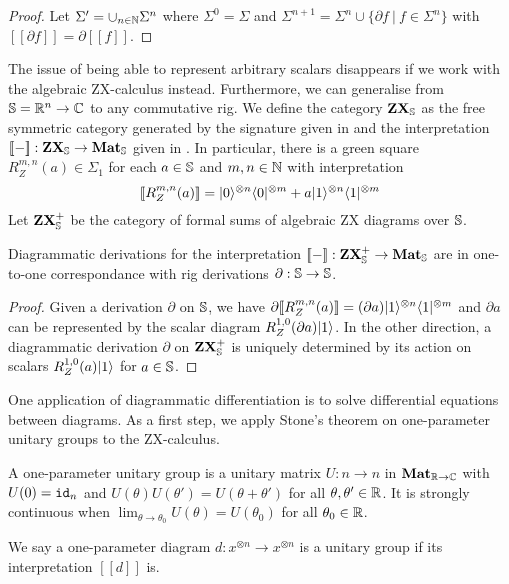 \begin{proof}
Let $\Sigma' = \cup_{n \in \N} \Sigma^n$ where $\Sigma^0 = \Sigma$
and $\Sigma^{n + 1} = \Sigma^n \cup \{ \partial f \ \vert \ f \in \Sigma^n \}$
with $[\![\partial f]\!] = \partial [\![f]\!]$.
\end{proof}

The issue of being able to represent arbitrary scalars disappears if we work
with the algebraic ZX-calculus instead. Furthermore, we can generalise
from $\S = \R^n \to \C$ to any commutative rig.
We define the category $\mathbf{ZX}_\S$ as the free symmetric category generated by the signature given in \cite[Table~2]{Wang20} and the interpretation $[\![-]\!] : \mathbf{ZX}_\S \to \mathbf{Mat}_\S$ given in \cite[§6]{Wang20}.
In particular, there is a green square $R_Z^{m, n}(a) \in \Sigma_1$ for each $a \in \S$ and $m, n \in \N$ with interpretation
$$[\![R_Z^{m, n}(a)]\!] = \ket{0}^{\otimes n} \bra{0}^{\otimes m} + a \ket{1}^{\otimes n} \bra{1}^{\otimes m}$$
Let $\mathbf{ZX}_\S^+$ be the category of formal sums of algebraic ZX
diagrams over $\S$.

\begin{theorem}
Diagrammatic derivations for the interpretation $[\![-]\!] : \mathbf{ZX}_\S^+ \to \mathbf{Mat}_\S$
are in one-to-one correspondance with rig derivations $\partial : \S \to \S$.
\end{theorem}

\begin{proof}
Given a derivation $\partial$ on $\S$, we have
$\partial [\![R_Z^{m, n}(a)]\!]
= (\partial a) \ket{1}^{\otimes n} \bra{1}^{\otimes m}$
and $\partial a$ can be represented by the scalar diagram
$R_Z^{1, 0}(\partial a) \ket{1}$.
In the other direction, a diagrammatic derivation $\partial$ on
$\mathbf{ZX}_\S^+$ is uniquely determined by its action on scalars
$R_Z^{1, 0}(a) \ket{1}$ for $a \in \S$.
\end{proof}

One application of diagrammatic differentiation is to solve
differential equations between diagrams. As a first step,
we apply Stone's theorem \cite{Stone32} on one-parameter unitary groups
to the ZX-calculus.

\begin{definition}
A one-parameter unitary group is a unitary matrix $U : n \to n$
in $\mathbf{Mat}_{\R \to \C}$ with $U(0) = \id_n$ and $U(\theta) U(\theta') = U(\theta + \theta')$
for all $\theta, \theta' \in \R$. It is strongly continuous when
$\lim_{\theta \to \theta_0} U(\theta) = U(\theta_0)$ for all $\theta_0 \in \R$.

We say a one-parameter diagram $d : x^{\otimes n} \to x^{\otimes n}$
is a unitary group if its interpretation $[\![d]\!]$ is.
\end{definition}

